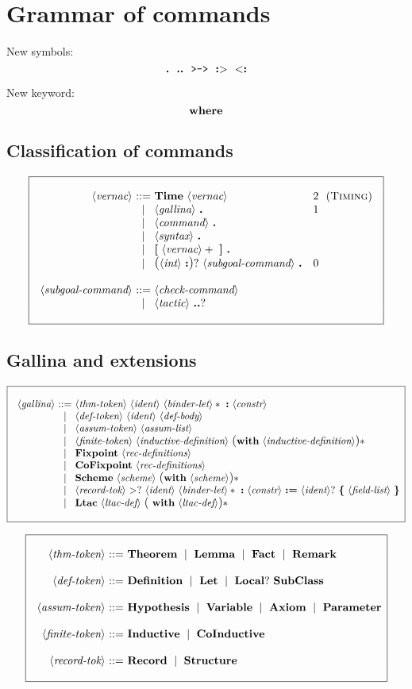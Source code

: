 \documentclass{article}
\makeatletter
\def\GR#1{\text{\large(}#1\text{\large)}}
\def\NT#1{\langle\textit{#1}\rangle}
\def\TERM#1{{\bf\textrm{\bf #1}}}
\def\KWD#1{\TERM{#1}}
\def\STAR#1{#1*}
\def\STARGR#1{\GR{#1}*}
\def\PLUS#1{#1+}
\def\OPT#1{#1?}
\def\OPTGR#1{\GR{#1}?}
\newenvironment{cadre}
        {\begin{array}{|c|}\hline\\}
        {\\\\\hline\end{array}}
\newenvironment{rulebox}
        {$$\begin{cadre}\begin{array}{r@{~}c@{~}l@{}l@{}r}}
        {\end{array}\end{cadre}$$}
\def\DEFNT#1{\NT{#1} & ::= &}
\def\RNAME#1{(\textsc{#1})}
\def\SEPDEF{\\\\}
\def\nlsep{\\&|&}
\newenvironment{rules}
        {\begin{center}\begin{rulebox}}
        {\end{rulebox}\end{center}}
\makeatother
\begin{document}
\section{Grammar of commands}

New symbols:
$$ \TERM{.}
~~ \TERM{..}
~~ \TERM{\tt >->}
~~ \TERM{:$>$}
~~ \TERM{$<$:}
$$

New keyword:
$$ \KWD{where}
$$

\subsection{Classification of commands}

\begin{rules}
\DEFNT{vernac}
       \TERM{Time}~\NT{vernac}  &2~~ &\RNAME{Timing}
\nlsep \NT{gallina}~\TERM{.}    &1
\nlsep \NT{command}~\TERM{.}
\nlsep \NT{syntax}~\TERM{.}
\nlsep \TERM{[}~\PLUS{\NT{vernac}}~\TERM{]}~\TERM{.}
\nlsep \OPTGR{\NT{int}~\KWD{:}}~\NT{subgoal-command}~\TERM{.} ~~~&0
\SEPDEF
\DEFNT{subgoal-command}
       \NT{check-command}
\nlsep %
   \NT{tactic}~\OPT{\KWD{..}}
\end{rules}

\subsection{Gallina and extensions}

\begin{rules}
\DEFNT{gallina}
       \NT{thm-token}~\NT{ident}~\STAR{\NT{binder-let}}~\KWD{:}~\NT{constr}
\nlsep \NT{def-token}~\NT{ident}~\NT{def-body}
\nlsep \NT{assum-token}~\NT{assum-list}
\nlsep \NT{finite-token}~\NT{inductive-definition}
      ~\STARGR{\KWD{with}~\NT{inductive-definition}}
\nlsep \TERM{Fixpoint}~\NT{rec-definitions}
\nlsep \TERM{CoFixpoint}~\NT{rec-definitions}
\nlsep \TERM{Scheme}~\NT{scheme}~\STARGR{\KWD{with}~\NT{scheme}}
\nlsep \NT{record-tok}~\OPT{\TERM{$>$}}~\NT{ident}~\STAR{\NT{binder-let}}
       ~\KWD{:}~\NT{constr}~\KWD{:=}
       ~\OPT{\NT{ident}}~\KWD{\{}~\NT{field-list}~\KWD{\}}
\nlsep \TERM{Ltac}~\NT{ltac-def}~\STARGR{~\TERM{with}~\NT{ltac-def}}
\end{rules}

\begin{rules}
\DEFNT{thm-token}
   \TERM{Theorem} ~\mid~ \TERM{Lemma} ~\mid~ \TERM{Fact} ~\mid~ \TERM{Remark}
\SEPDEF
\DEFNT{def-token}
   \TERM{Definition} ~\mid~ \TERM{Let} ~\mid~
   \OPT{\TERM{Local}}~\TERM{SubClass}
\SEPDEF
\DEFNT{assum-token}
    \TERM{Hypothesis} ~\mid~ \TERM{Variable} ~\mid~ \TERM{Axiom} ~\mid~
    \TERM{Parameter}
\SEPDEF
\DEFNT{finite-token}
    \TERM{Inductive} ~\mid~ \TERM{CoInductive}
\SEPDEF
\DEFNT{record-tok}
    \TERM{Record} ~\mid~ \TERM{Structure}
\end{rules}
\end{document}
